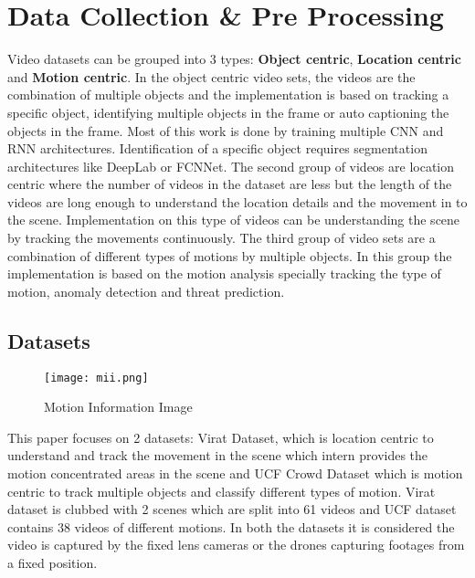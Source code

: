 \chapter{Data Collection \& Pre Processing}
Video datasets can be grouped into 3 types: \textbf{Object centric}, \textbf{Location centric} and \textbf{Motion centric}. In the object centric video sets, the videos are the combination of multiple objects and the implementation is based on tracking a specific object, identifying multiple objects in the frame or auto captioning the objects in the frame. Most of this work is done by training multiple CNN and RNN architectures. Identification of a specific object requires segmentation architectures like DeepLab or FCNNet. The second group of videos are location centric where the number of videos in the dataset are less but the length of the videos are long enough to understand the location details and the movement in to the scene. Implementation on this type of videos can be understanding the scene by tracking the movements continuously. The third group of video sets are a combination of different types of motions by multiple objects. In this group the implementation is based on the motion analysis specially tracking the type of motion, anomaly detection and threat prediction.

\section{Datasets}
\begin{wrapfigure}{r}{0.35\textwidth} %
    \centering
    \texttt{[image: mii.png]}
    \caption{Motion Information Image}
    \label{fig:mii}
\end{wrapfigure}
This paper focuses on 2 datasets: Virat Dataset, which is location centric to understand and track the movement in the scene which intern provides the motion concentrated areas in the scene and UCF Crowd Dataset which is motion centric to track multiple objects and classify different types of motion.
Virat dataset is clubbed with 2 scenes which are split into 61 videos and UCF dataset contains 38 videos of different motions. In both the datasets it is considered the video is captured by the fixed lens cameras or the drones capturing footages from a fixed position. 


